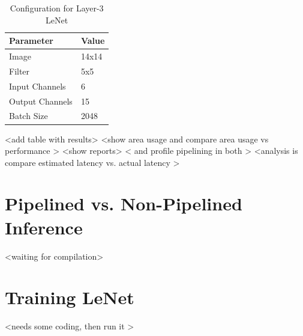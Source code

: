 \begin{table}[]
\centering
\begin{tabular}{|l|l|}
\hline
\textbf{Parameter} & \textbf{Value} \\ \hline
Image              & 14x14          \\ \hline
Filter             & 5x5            \\ \hline
Input Channels     & 6             \\ \hline
Output Channels    & 15             \\ \hline
Batch Size         & 2048           \\ \hline
\end{tabular}
\caption{Configuration for Layer-3 LeNet}
\label{tab:l3params}
\end{table}

<add table with results>
<show area usage and compare area usage vs performance >
<show reports>
< and profile pipelining in both > 
<analysis is compare estimated latency vs. actual latency > 


\section{Pipelined vs. Non-Pipelined Inference}

<waiting for compilation>


\section{Training LeNet}

<needs some coding, then run it > 

